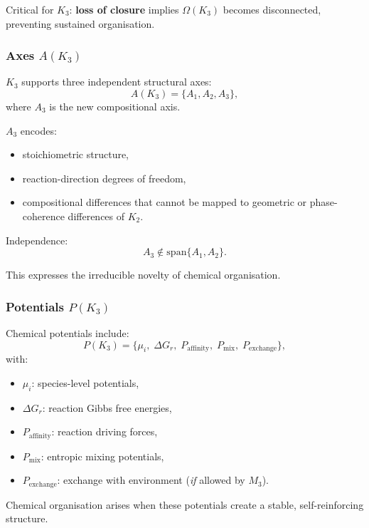 Critical for $K_3$:  
\textbf{loss of closure} implies $\Omega(K_3)$ becomes disconnected,
preventing sustained organisation.

\subsubsection{Axes \texorpdfstring{$A(K_3)$}{A(K_3)}}

$K_3$ supports three independent structural axes:
\[
A(K_3) = \{A_1, A_2, A_3\},
\]
where $A_3$ is the new compositional axis.

$A_3$ encodes:
\begin{itemize}
    \item stoichiometric structure,
    \item reaction-direction degrees of freedom,
    \item compositional differences that cannot be mapped to geometric
          or phase-coherence differences of $K_2$.
\end{itemize}

Independence:
\[
A_3 \notin \mathrm{span}\{A_1,A_2\}.
\]

This expresses the irreducible novelty of chemical organisation.

\subsubsection{Potentials \texorpdfstring{$P(K_3)$}{P(K_3)}}

Chemical potentials include:
\[
P(K_3) = \{ \mu_i,\; \Delta G_r,\; P_{\mathrm{affinity}},\;
           P_{\mathrm{mix}},\; P_{\mathrm{exchange}}\},
\]
with:
\begin{itemize}
    \item $\mu_i$: species-level potentials,
    \item $\Delta G_r$: reaction Gibbs free energies,
    \item $P_{\mathrm{affinity}}$: reaction driving forces,
    \item $P_{\mathrm{mix}}$: entropic mixing potentials,
    \item $P_{\mathrm{exchange}}$: exchange with environment (\emph{if}
          allowed by $M_3$).
\end{itemize}

Chemical organisation arises when these potentials create a stable,
self-reinforcing structure.

